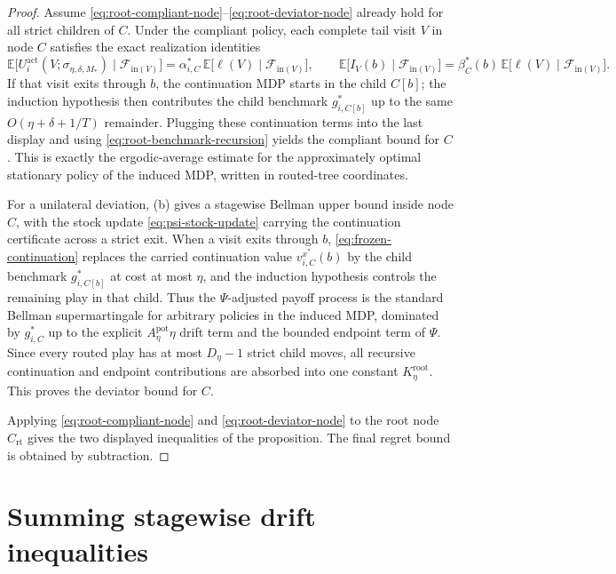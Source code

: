 \documentclass[12pt]{article}
\theoremstyle{definition}
\newcommand{\E}{\mathbb{E}}
\newcommand{\1}{\mathbf{1}}
\newcommand{\cF}{\mathcal{F}}
\begin{document}
\begin{proof}
Assume \eqref{eq:root-compliant-node}--\eqref{eq:root-deviator-node} already hold
for all strict children of $C$. Under the compliant policy, each complete tail
visit $V$ in node $C$ satisfies the exact realization identities
\[
\E\bigl[U_i^{\mathrm{act}}(V;\sigma_{\eta,\delta,M_*})\mid \cF_{\mathrm{in}(V)}\bigr]
=
\alpha_{i,C}^*\,\E\bigl[\ell(V)\mid \cF_{\mathrm{in}(V)}\bigr],
\qquad
\E\bigl[I_V(b)\mid \cF_{\mathrm{in}(V)}\bigr]
=
\beta_C^*(b)\,\E\bigl[\ell(V)\mid \cF_{\mathrm{in}(V)}\bigr].
\]
If that visit exits through $b$, the continuation MDP starts in the child
$C[b]$; the induction hypothesis then contributes the child benchmark
$g_{i,C[b]}^*$ up to the same $O(\eta+\delta+1/T)$ remainder. Plugging these
continuation terms into the last display and using
\eqref{eq:root-benchmark-recursion} yields the compliant bound for $C$. This is
exactly the ergodic-average estimate for the approximately optimal stationary
policy of the induced MDP, written in routed-tree coordinates.

For a unilateral deviation, \textnormal{(b)} gives a
stagewise Bellman upper bound inside node $C$, with the stock update
\eqref{eq:psi-stock-update} carrying the continuation certificate across a strict
exit. When a visit exits through $b$, \eqref{eq:frozen-continuation} replaces the
carried continuation value $v_{i,C}^{x^*}(b)$ by the child benchmark
$g_{i,C[b]}^*$ at cost at most $\eta$, and the induction hypothesis controls the
remaining play in that child. Thus the $\Psi$-adjusted payoff process is the
standard Bellman supermartingale for arbitrary policies in the induced MDP,
dominated by $g_{i,C}^*$ up to the explicit $A_\eta^{\mathrm{pot}}\eta$ drift term
and the bounded endpoint term of $\Psi$. Since every routed play has at most
$D_\eta-1$ strict child moves, all recursive continuation and endpoint
contributions are absorbed into one constant $K_\eta^{\mathrm{root}}$. This proves
the deviator bound for $C$.

Applying \eqref{eq:root-compliant-node} and \eqref{eq:root-deviator-node} to the
root node $C_{\mathrm{rt}}$ gives the two displayed inequalities of the
proposition. The final regret bound is obtained by subtraction.
\end{proof}



\section{Summing stagewise drift inequalities}
\label{app:aggregation}
\end{document}
